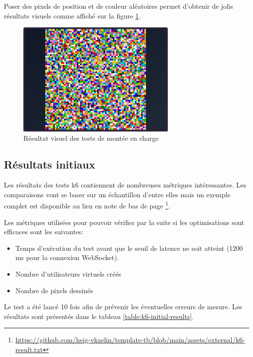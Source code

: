 Poser des pixels de position et de couleur aléatoires permet d'obtenir de jolis résultats visuels comme affiché sur la figure \ref{fig:load-test-result}.

\begin{figure}[H]
  \centering
  \includegraphics[width=0.7\textwidth]{assets/figures/load-test-result.png}
  \caption{Résultat visuel des tests de montée en charge}
  \label{fig:load-test-result}
\end{figure}

\subsection{Résultats initiaux}

Les résultats des tests k6 contiennent de nombreuses métriques intéressantes. Les comparaisons vont se baser sur un échantillon d'entre elles mais un exemple complet est disponible au lien en note de bas de page \footnote{\url{https://github.com/heig-vkaelin/template-tb/blob/main/assets/external/k6-result.txt}}.

Les métriques utilisées pour pouvoir vérifier par la suite si les optimisations sont efficaces sont les suivantes:

\begin{itemize}
  \item Temps d'exécution du test avant que le seuil de latence ne soit atteint (1200 ms pour la connexion WebSocket).
  \item Nombre d'utilisateurs virtuels créés
  \item Nombre de pixels dessinés
\end{itemize}

Le test a été lancé 10 fois afin de prévenir les éventuelles erreurs de mesure. Les résultats sont présentés dans le tableau \ref{table:k6-initial-results}.

